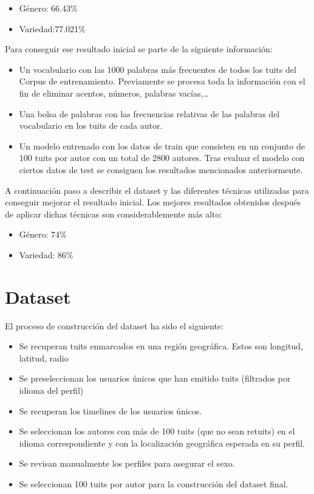 \documentclass[11pt,a4paper]{article}
\begin{document}
\begin{itemize}
 \item  G\'enero: 66.43\%
 \item Variedad:77.021\%
\end{itemize}

Para conseguir ese resultado inicial se parte de la siguiente informaci\'on:
\begin{itemize}
 \item  Un vocabulario con las 1000 palabras m\'as frecuentes de todos los tuits del Corpus de entrenamiento. Previamente se procesa toda la informaci\'on con el fin de eliminar acentos, n\'umeros, palabras vac\'ias,…
 \item Una bolsa de palabras con las frecuencias relativas de las palabras del vocabulario en los tuits de cada autor.
 \item Un modelo entrenado con los datos de train que consisten en un conjunto de 100 tuits por autor con un total de 2800 autores.
Tras evaluar el modelo con ciertos datos de test se consiguen los resultados mencionados anteriormente.
\end{itemize}

A continuaci\'on paso a describir el dataset y las diferentes t\'ecnicas utilizadas para conseguir mejorar el resultado inicial.
Los mejores resultados obtenidos despu\'es de aplicar dichas t\'ecnicas son  considerablemente m\'as alto:
\begin{itemize}
 \item  G\'enero: 74\%
 \item Variedad: 86\%
\end{itemize}



\section{Dataset}

El proceso de construcci\'on del dataset ha sido el siguiente:
\begin{itemize}
 \item Se recuperan tuits enmarcados en una regi\'on geogr\'afica. Estos son longitud, latitud, radio
 \item Se preseleccionan los usuarios \'unicos que han emitido tuits (filtrados por idioma del perfil)
 \item Se recuperan los timelines de los usuarios \'unicos.
 \item Se seleccionan los autores con m\'as de 100 tuits (que no sean retuits) en el idioma correspondiente y con la localizaci\'on geogr\'afica esperada en su perfil.
 \item Se revisan manualmente los perfiles para asegurar el sexo.
 \item Se seleccionan 100 tuits por autor para la construcci\'on del dataset final.
\end{itemize}
\end{document}
